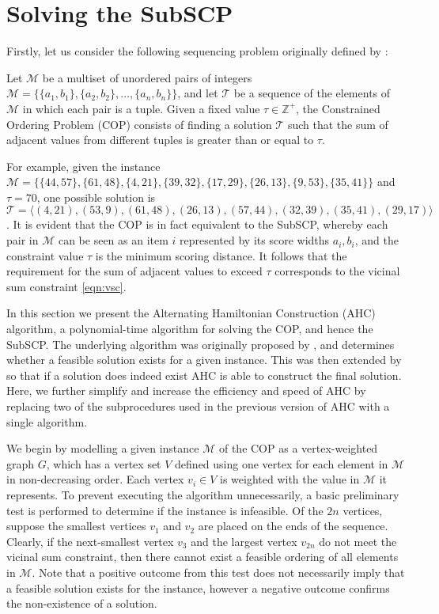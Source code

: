\documentclass[authoryear]{elsarticle}
\begin{document}
\section{Solving the SubSCP}
\label{sec:ahc}
\noindent Firstly, let us consider the following sequencing problem originally defined by \citet{hawa2018}:

\begin{definition} %
	\label{defn:cop}
	Let $\mathcal{M}$ be a multiset of unordered pairs of integers $\mathcal{M} = \{\{a_1, b_1\}, \{a_2, b_2\},\dotsc,\{a_n, b_n\}\}$, and let $\mathcal{T}$ be a sequence of the elements of $\mathcal{M}$ in which each pair is a tuple. Given a fixed value $\tau \in \mathbb{Z}^+$, the Constrained Ordering Problem (COP) consists of finding a solution $\mathcal{T}$ such that the sum of adjacent values from different tuples is greater than or equal to $\tau$.
\end{definition}

\noindent For example, given the instance $\mathcal{M} = \{\{44,57\}, \{61,48\}, \{4,21\}, \{39,32\}, \{17,29\}, \{26,13\}, \{9,53\}, \{35,41\} \}$ and $\tau = 70$, one possible solution is $\mathcal{T} = \langle(4,21), (53,9), (61,48), (26,13), (57,44), (32,39), (35,41), (29,17)\rangle$. It is evident that the COP is in fact equivalent to the SubSCP, whereby each pair in $\mathcal{M}$ can be seen as an item $i$ represented by its score widths $a_i, b_i$, and the constraint value $\tau$ is the minimum scoring distance. It follows that the requirement for the sum of adjacent values to exceed $\tau$ corresponds to the vicinal sum constraint \eqref{eqn:vsc}.

In this section we present the Alternating Hamiltonian Construction (AHC) algorithm, a polynomial-time algorithm for solving the COP, and hence the SubSCP. The underlying algorithm was originally proposed by \citet{becker2010}, and determines whether a feasible solution exists for a given instance. This was then extended by \citet{hawa2018} so that if a solution does indeed exist AHC is able to construct the final solution. Here, we further simplify and increase the efficiency and speed of AHC by replacing two of the subprocedures used in the previous version of AHC with a single algorithm.

We begin by modelling a given instance $\mathcal{M}$ of the COP as a vertex-weighted graph $G$, which has a vertex set $V$ defined using one vertex for each element in $\mathcal{M}$ in non-decreasing order. Each vertex $v_i \in V$ is weighted with the value in $\mathcal{M}$ it represents. To prevent executing the algorithm unnecessarily, a basic preliminary test is performed to determine if the instance is infeasible. Of the $2n$ vertices, suppose the smallest vertices $v_1$ and $v_2$ are placed on the ends of the sequence. Clearly, if the next-smallest vertex $v_3$ and the largest vertex $v_{2n}$ do not meet the vicinal sum constraint, then there cannot exist a feasible ordering of all elements in $\mathcal{M}$. Note that a positive outcome from this test does not necessarily imply that a feasible solution exists for the instance, however a negative outcome confirms the non-existence of a solution.
\end{document}
